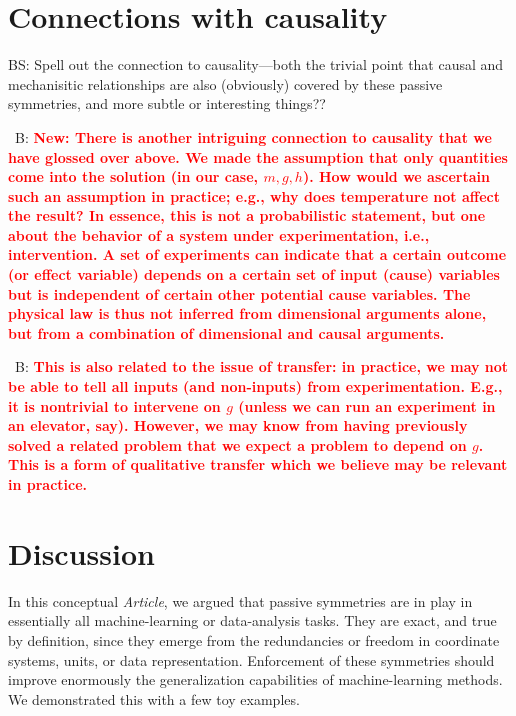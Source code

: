\documentclass{article}
\theoremstyle{plain}
\theoremstyle{definition}
\theoremstyle{remark}
\newcommand{\documentname}{\textsl{Article}}
\newcommand{\bernhard}[1]{~B: \textcolor{red}{\textbf{#1}}}
\begin{document}
\section{Connections with causality}\label{sec:causality}

BS: Spell out the connection to causality---both the trivial point that causal and mechanisitic relationships are also (obviously) covered by these passive symmetries, and more subtle or interesting things??

\bernhard{New: There is another intriguing connection to causality that we have glossed over above.
We made the assumption that only quantities come into the solution (in our case, $m, g, h$). How would we ascertain such an assumption in practice; e.g., why does temperature not affect the result? In essence, this is not a probabilistic statement, but one about the behavior of a system under experimentation, i.e., intervention. A set of experiments can indicate that a certain outcome (or effect variable) depends on a certain set of input (cause) variables but is independent of certain other potential cause variables. The physical law is thus not inferred from dimensional arguments alone, but from a combination of dimensional and causal arguments.}

\bernhard{This is also related to the issue of transfer: in practice, we may not be able to tell all inputs (and non-inputs) from experimentation. E.g., it is nontrivial to intervene on $g$ (unless we can run an experiment in an elevator, say). However, we may know from having previously solved a related problem that we expect a problem to depend on $g$. This is a form of qualitative transfer which we believe may be relevant in practice.}

\section{Discussion}\label{sec:discussion}

In this conceptual \documentname,
we argued that passive symmetries are in play in essentially all machine-learning or data-analysis tasks.
They are exact, and true by definition, since they emerge from the redundancies or freedom in coordinate systems, units, or data representation.
Enforcement of these symmetries should improve enormously the generalization capabilities of machine-learning methods.
We demonstrated this with a few toy examples.
\end{document}
